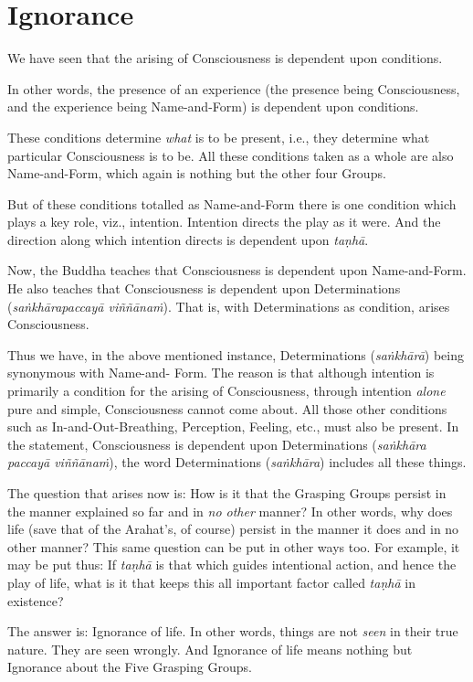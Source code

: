 \chapter{Ignorance}

We have seen that the arising of Consciousness is dependent upon conditions.

In other words, the presence of an experience (the presence being Consciousness, and the experience being Name-and-Form) is dependent upon conditions.

These conditions determine \emph{what} is to be present, i.e., they determine what particular Consciousness is to be. All these conditions taken as a whole are also Name-and-Form, which again is nothing but the other four Groups.

But of these conditions totalled as Name-and-Form there is one condition which plays a key role, viz., intention. Intention directs the play as it were. And the direction along which intention directs is dependent upon \textit{taṇhā}.

Now, the Buddha teaches that Consciousness is dependent upon Name-and-Form. He also teaches that Consciousness is dependent upon Determinations (\textit{saṅkhārapaccayā viññānaṁ}). That is, with Determinations as condition, arises Consciousness.

Thus we have, in the above mentioned instance, Determinations (\textit{saṅkhārā}) being synonymous with Name-and- Form. The reason is that although intention is primarily a condition for the arising of Consciousness, through intention \emph{alone} pure and simple, Consciousness cannot come about. All those other conditions such as In-and-Out-Breathing, Perception, Feeling, etc., must also be present. In the statement, Consciousness is dependent upon Determinations (\textit{saṅkhāra paccayā viññānaṁ}), the word Determinations (\textit{saṅkhāra}) includes all these things.

The question that arises now is: How is it that the Grasping Groups persist in the manner explained so far and in \emph{no other} manner? In other words, why does life (save that of the Arahat's, of course) persist in the manner it does and in no other manner? This same question can be put in other ways too. For example, it may be put thus: If \textit{taṇhā} is that which guides intentional action, and hence the play of life, what is it that keeps this all important factor called \textit{taṇhā} in existence?

The answer is: Ignorance of life. In other words, things are not \emph{seen} in their true nature. They are seen wrongly. And Ignorance of life means nothing but Ignorance about the Five Grasping Groups.

